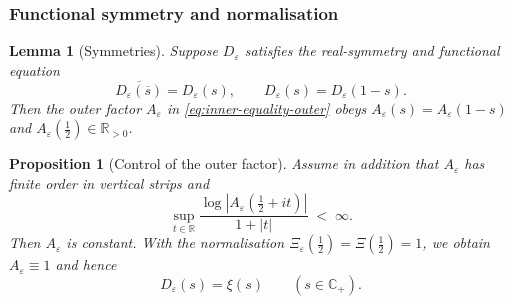﻿\documentclass[12pt,a4paper]{article}
\newtheorem{lemma}[theorem]{Lemma}
\newtheorem{proposition}[theorem]{Proposition}
\theoremstyle{definition}
\theoremstyle{remark}
\newcommand{\CC}{\mathbb{C}}
\newcommand{\RR}{\mathbb{R}}
\begin{document}
\subsubsection*{Functional symmetry and normalisation}
\begin{lemma}[Symmetries]\label{lem:sym}
Suppose $D_\varepsilon$ satisfies the real-symmetry and functional equation
\begin{equation}\label{eq:symmetries}
  \overline{D_\varepsilon(\overline{s})}=D_\varepsilon(s),\qquad D_\varepsilon(s)=D_\varepsilon(1-s).
\end{equation}
Then the outer factor $A_\varepsilon$ in \eqref{eq:inner-equality-outer} obeys $A_\varepsilon(s)=A_\varepsilon(1-s)$ and $A_\varepsilon(\tfrac12)\in\RR_{>0}$.
\end{lemma}

\begin{proposition}[Control of the outer factor]\label{prop:outer}
Assume in addition that $A_\varepsilon$ has finite order in vertical strips and
\begin{equation}\label{eq:PL}
  \sup_{t\in\RR}\frac{\log|A_\varepsilon(\tfrac12+it)|}{1+|t|}\;<\;\infty.
\end{equation}
Then $A_\varepsilon$ is constant. With the normalisation $\Xi_\varepsilon(\tfrac12)=\Xi(\tfrac12)=1$, we obtain $A_\varepsilon\equiv1$ and hence
\begin{equation}\label{eq:D-equals-xi}
  D_\varepsilon(s)=\xi(s)\qquad (s\in\CC_+).
\end{equation}
\end{proposition}
\end{document}
